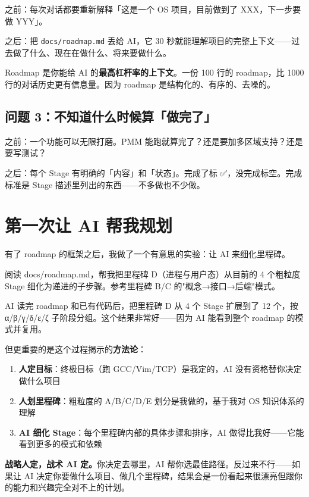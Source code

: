 之前：每次对话都要重新解释「这是一个 OS 项目，目前做到了 XXX，下一步要做 YYY」。

之后：把 \texttt{docs/roadmap.md} 丢给 AI，它 30 秒就能理解项目的完整上下文——过去做了什么、现在在做什么、将来要做什么。

\begin{promptbox}
Roadmap 是你能给 AI 的\textbf{最高杠杆率的上下文}。一份 100 行的 roadmap，比 1000 行的对话历史更有信息量。因为 roadmap 是结构化的、有序的、去噪的。
\end{promptbox}

\subsection{问题 3：不知道什么时候算「做完了」}

之前：一个功能可以无限打磨。PMM 能跑就算完了？还是要加多区域支持？还是要写测试？

之后：每个 Stage 有明确的「内容」和「状态」。完成了标 ✅，没完成标空。完成标准是 Stage 描述里列出的东西——不多做也不少做。

\section{第一次让 AI 帮我规划}

有了 roadmap 的框架之后，我做了一个有意思的实验：让 AI 来细化里程碑。

\begin{humanmsg}
阅读 docs/roadmap.md，帮我把里程碑 D（进程与用户态）从目前的 4 个粗粒度 Stage 细化为递进的子步骤。参考里程碑 B/C 的"概念→接口→后端"模式。
\end{humanmsg}

AI 读完 roadmap 和已有代码后，把里程碑 D 从 4 个 Stage 扩展到了 12 个，按 α/β/γ/δ/ε/ζ 子阶段分组。这个结果非常好——因为 AI 能看到整个 roadmap 的模式并复用。

但更重要的是这个过程揭示的\textbf{方法论}：

\begin{enumerate}
  \item \textbf{人定目标}：终极目标（跑 GCC/Vim/TCP）是我定的，AI 没有资格替你决定做什么项目
  \item \textbf{人划里程碑}：粗粒度的 A/B/C/D/E 划分是我做的，基于我对 OS 知识体系的理解
  \item \textbf{AI 细化 Stage}：每个里程碑内部的具体步骤和排序，AI 做得比我好——它能看到更多的模式和依赖
\end{enumerate}

\begin{lessonbox}
\textbf{战略人定，战术 AI 定。}你决定去哪里，AI 帮你选最佳路径。反过来不行——如果让 AI 决定你要做什么项目、做几个里程碑，结果会是一份看起来很漂亮但跟你的能力和兴趣完全对不上的计划。
\end{lessonbox}

